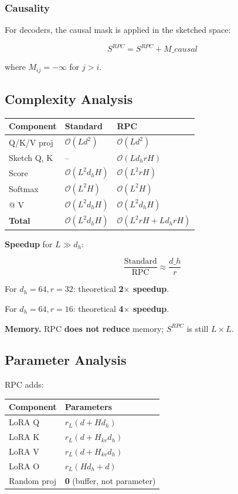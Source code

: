 \subsubsection{Causality}

For decoders, the causal mask is applied in the sketched space:

\[
S^{RPC} = S^{RPC} + M\_{causal}
\tag{4.5}
\]

where $M_{ij} = -\infty$ for $j > i$.

\subsection{Complexity Analysis}

\begin{table}[H]
\centering
\small
\begin{tabular}{lll}
\toprule
\textbf{Component} & \textbf{Standard} & \textbf{RPC} \\
\midrule
Q/K/V proj & $\mathcal{O}(L d^2)$ & $\mathcal{O}(L d^2)$ \\
Sketch Q, K & -- & $\mathcal{O}(L d_h r H)$ \\
Score & $\mathcal{O}(L^2 d_h H)$ & $\mathcal{O}(L^2 r H)$ \\
Softmax & $\mathcal{O}(L^2 H)$ & $\mathcal{O}(L^2 H)$ \\
@ V & $\mathcal{O}(L^2 d_h H)$ & $\mathcal{O}(L^2 d_h H)$ \\
\textbf{Total} & $\mathcal{O}(L^2 d_h H)$ & $\mathcal{O}(L^2 r H + L d_h r H)$ \\
\bottomrule
\end{tabular}
\end{table}

\textbf{Speedup} for $L \gg d_h$:

\[
\frac{\text{Standard}}{\text{RPC}} \approx \frac{d\_h}{r}
\tag{4.6}
\]

For $d_h = 64, r = 32$: theoretical \textbf{2$\times$ speedup}.

For $d_h = 64, r = 16$: theoretical \textbf{4$\times$ speedup}.

\textbf{Memory.} RPC \textbf{does not reduce} memory; $S^{RPC}$ is still $L \times L$.

\subsection{Parameter Analysis}

RPC adds:

\begin{table}[H]
\centering
\small
\begin{tabular}{ll}
\toprule
\textbf{Component} & \textbf{Parameters} \\
\midrule
LoRA Q & $r_L(d + H d_h)$ \\
LoRA K & $r_L(d + H_{kv} d_h)$ \\
LoRA V & $r_L(d + H_{kv} d_h)$ \\
LoRA O & $r_L(H d_h + d)$ \\
Random proj & \textbf{0} (buffer, not parameter) \\
\bottomrule
\end{tabular}
\end{table}

